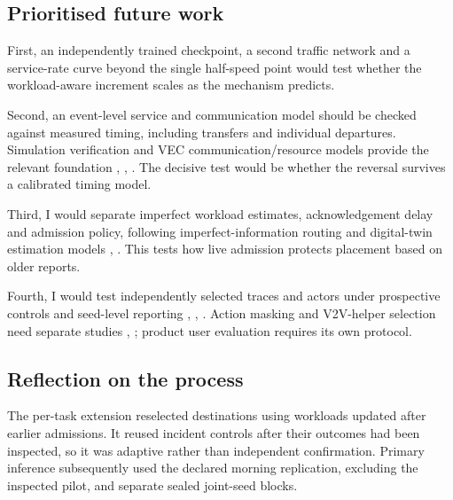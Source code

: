 \documentclass[12pt,a4paper]{article}
\begin{document}
\FloatBarrier
\subsection{Prioritised future work}\label{sec:4.3}

First, an independently trained checkpoint, a second traffic network and a service-rate curve beyond the single half-speed point would test whether the workload-aware increment scales as the mechanism predicts.

Second, an event-level service and communication model should be checked against measured timing, including transfers and individual departures. Simulation verification and VEC communication/resource models provide the relevant foundation \cite{ref6}, \cite{ref21}, \cite{ref31}. The decisive test would be whether the reversal survives a calibrated timing model.

Third, I would separate imperfect workload estimates, acknowledgement delay and admission policy, following imperfect-information routing and digital-twin estimation models \cite{ref18}, \cite{ref30}. This tests how live admission protects placement based on older reports.

Fourth, I would test independently selected traces and actors under prospective controls and seed-level reporting \cite{ref25}, \cite{ref26}, \cite{ref39}. Action masking and V2V-helper selection need separate studies \cite{ref32}, \cite{ref40}; product user evaluation requires its own protocol.

\FloatBarrier
\subsection{Reflection on the process}\label{sec:4.4}

The per-task extension reselected destinations using workloads updated after earlier admissions. It reused incident controls after their outcomes had been inspected, so it was adaptive rather than independent confirmation. Primary inference subsequently used the declared morning replication, excluding the inspected pilot, and separate sealed joint-seed blocks.
\end{document}
